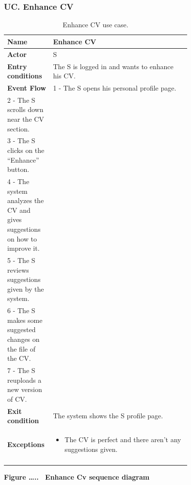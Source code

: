 \subsubsection*{UC\cuc . Enhance CV}
\begin{center}
    \begin{longtable}{|l|p{0.75\linewidth}|}
        \hline
        \textbf{Name}               & Enhance CV\\
        \hline
        \textbf{Actor}              & S\\
        \hline
        \textbf{Entry conditions}   & The S is logged in and wants to enhance his CV.\\
        \hline
        \textbf{Event Flow}         & 
        1 - The S opens his personal profile page. \\
        2 - The S scrolls down near the CV section. \\
        3 - The S clicks on the “Enhance” button. \\
        4 - The system analyzes the CV and gives suggestions on how to improve it. \\
        5 - The S reviews suggestions given by the system. \\
        6 - The S makes some suggested changes on the file of the CV. \\
        7 - The S reuploads a new version of CV. \\
        \hline
        \textbf{Exit condition}   & The system shows the S profile page. \\       
        \hline
        \textbf{Exceptions}       & \begin{itemize}
            \item The CV is perfect and there aren’t any suggestions given.
        \end{itemize}\\
        \hline
        \caption{Enhance CV use case.}
        \label{tab: enhance_cv_use_case}
    \end{longtable}
\end{center}
 

\textbf{Figure \ldots..~ Enhance Cv sequence diagram}

